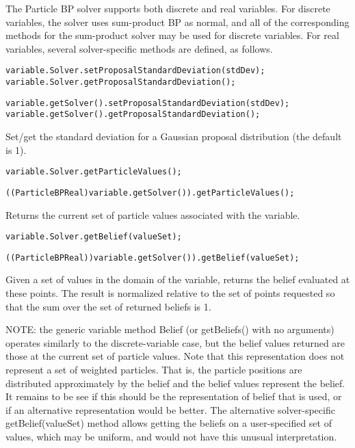 
The Particle BP solver supports both discrete and real variables. For discrete variables, the solver uses sum-product BP as normal, and all of the corresponding methods for the sum-product solver may be used for discrete variables. For real variables, several solver-specific methods are defined, as follows.

\label{sec:ParticleBPRealVariableSpecificMethods}

\ifmatlab
\begin{lstlisting}
variable.Solver.setProposalStandardDeviation(stdDev);
variable.Solver.getProposalStandardDeviation();
\end{lstlisting}
\fi

\ifjava
\begin{lstlisting}
variable.getSolver().setProposalStandardDeviation(stdDev);
variable.getSolver().getProposalStandardDeviation();
\end{lstlisting}
\fi


Set/get the standard deviation for a Gaussian proposal distribution (the default is 1).

\ifmatlab
\begin{lstlisting}
variable.Solver.getParticleValues();
\end{lstlisting}
\fi

\ifjava
\begin{lstlisting}
((ParticleBPReal)variable.getSolver()).getParticleValues();
\end{lstlisting}
\fi

Returns the current set of particle values associated with the variable.

\ifmatlab
\begin{lstlisting}
variable.Solver.getBelief(valueSet);
\end{lstlisting}
\fi

\ifjava
\begin{lstlisting}
((ParticleBPReal))variable.getSolver()).getBelief(valueSet);
\end{lstlisting}
\fi

Given a set of values in the domain of the variable, returns the belief evaluated at these points. The result is normalized relative to the set of points requested so that the sum over the set of returned beliefs is 1.

NOTE: the generic variable method Belief (or getBeliefs() with no arguments) operates similarly to the discrete-variable case, but the belief values returned are those at the current set of particle values. Note that this representation does not represent a set of weighted particles. That is, the particle positions are distributed approximately by the belief and the belief values represent the belief. It remains to be see if this should be the representation of belief that is used, or if an alternative representation would be better. The alternative solver-specific getBelief(valueSet) method allows getting the beliefs on a user-specified set of values, which may be uniform, and would not have this unusual interpretation.


